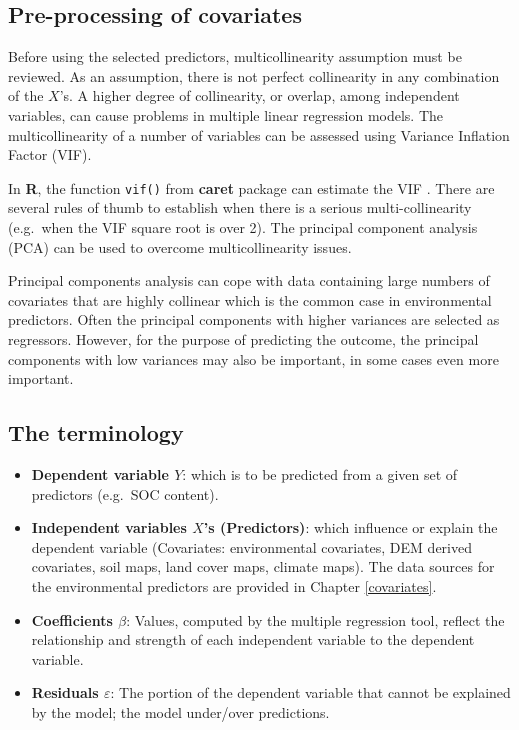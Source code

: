\documentclass[10pt,b5paper,]{book}
\providecommand{\tightlist}{%
  \setlength{\itemsep}{0pt}\setlength{\parskip}{0pt}}
\theoremstyle{definition}
\theoremstyle{definition}
\theoremstyle{definition}
\theoremstyle{remark}
\begin{document}
\hypertarget{pre-processing-of-covariates}{%
\subsection{Pre-processing of
covariates}\label{pre-processing-of-covariates}}

Before using the selected predictors, multicollinearity assumption must
be reviewed. As an assumption, there is not perfect collinearity in any
combination of the \(X\)'s. A higher degree of collinearity, or overlap,
among independent variables, can cause problems in multiple linear
regression models. The multicollinearity of a number of variables can be
assessed using Variance Inflation Factor (VIF).

In \textbf{R}, the function \texttt{vif()} from \textbf{caret} package
can estimate the VIF . There are
several rules of thumb to establish when there is a serious
multi-collinearity (e.g.~when the VIF square root is over 2). The
principal component analysis (PCA) can be used to overcome
multicollinearity issues.

Principal components analysis can cope with data containing large
numbers of covariates that are highly collinear which is the common case
in environmental predictors. Often the principal components with higher
variances are selected as regressors. However, for the purpose of
predicting the outcome, the principal components with low variances may
also be important, in some cases even more important.

\hypertarget{the-terminology}{%
\subsection{The terminology}\label{the-terminology}}

\begin{itemize}
\tightlist
\item
  \textbf{Dependent variable \(Y\)}:  which is
  to be predicted from a given set of predictors (e.g.~SOC content).
\item
  \textbf{Independent variables \(X\)'s (Predictors)}: which influence
  or explain the dependent variable (Covariates: environmental
  covariates, DEM derived covariates, soil maps, land cover maps,
  climate maps). The data sources for the environmental predictors are
  provided in Chapter \ref{covariates}.
\item
  \textbf{Coefficients \(\beta\)}: Values, computed by the multiple
  regression tool, reflect the relationship and strength of each
  independent variable to the dependent variable.
\item
  \textbf{Residuals \(\varepsilon\)}: The portion of the dependent
  variable that cannot be explained by the model; the model under/over
  predictions.
\end{itemize}
\end{document}
